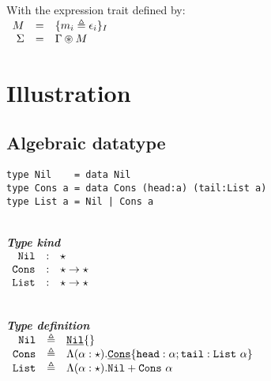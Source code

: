 \documentclass{article}[11pt]
\newcommand{\subsubsubsection}[1]
{
    ~\\
    {\bf {\em #1}} \\
}
\newcommand{\term}[1]{\verb~#1~}
\newcommand{\cons}[1]{\underline{\verb~#1~}}
\begin{document}
    With the expression trait defined by: \\

    \begin{math}
        \begin{array}{rclp{5cm}}
            M      & = & \{ m_i \triangleq \epsilon_i \}_I \\
            \Sigma & = & \Gamma \circledast M              \\
        \end{array}
    \end{math}


    \section{Illustration}\label{sec:illustration}

    \subsection{Algebraic datatype}\label{subsec:algebraic-datatype}

    \begin{verbatim}
type Nil    = data Nil
type Cons a = data Cons (head:a) (tail:List a)
type List a = Nil | Cons a
    \end{verbatim}

    \subsubsubsection{Type kind}

    \noindent
    \begin{math}
        \begin{array}{rclp{5cm}}
            \term{Nil}  & : & \star                   \\
            \term{Cons} & : & \star \rightarrow \star \\
            \term{List} & : & \star \rightarrow \star
        \end{array}
    \end{math}

    \subsubsubsection{Type definition}

    \noindent
    \begin{math}
        \begin{array}{rclp{5cm}}
            \term{Nil}  & \triangleq & \cons{Nil}\{\}                                                                                \\
            \term{Cons} & \triangleq & \Lambda(\alpha:\star).\cons{Cons}\{ \term{head} :\alpha; \term{tail} : \term{List} ~\alpha \} \\
            \term{List} & \triangleq & \Lambda(\alpha:\star).\term{Nil} + \term{Cons} ~ \alpha
        \end{array}
    \end{math}
\end{document}
